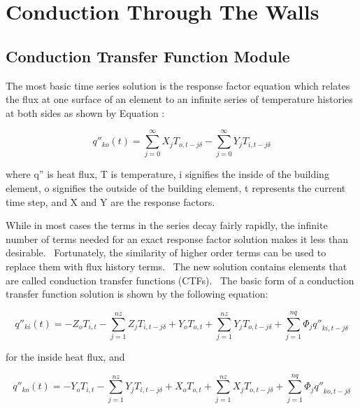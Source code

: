 \section{Conduction Through The Walls}\label{conduction-through-the-walls}

\subsection{Conduction Transfer Function Module}\label{conduction-transfer-function-module}

The most basic time series solution is the response factor equation which relates the flux at one surface of an element to an infinite series of temperature histories at both sides as shown by Equation :

\begin{equation}
{q''_{ko}}(t) = \sum\limits_{j = 0}^\infty  {{X_j}} {T_{o,t - j\delta }} - \sum\limits_{j = 0}^\infty  {{Y_j}} {T_{i,t - j\delta }}
\end{equation}

where q'' is heat flux, T is temperature, i signifies the inside of the building element, o signifies the outside of the building element, t represents the current time step, and X and Y are the response factors.

While in most cases the terms in the series decay fairly rapidly, the infinite number of terms needed for an exact response factor solution makes it less than desirable.~ Fortunately, the similarity of higher order terms can be used to replace them with flux history terms.~ The new solution contains elements that are called conduction transfer functions (CTFs).~ The basic form of a conduction transfer function solution is shown by the following equation:

\begin{equation}
{q''_{ki}}(t) =  - {Z_o}{T_{i,t}} - \sum\limits_{j = 1}^{nz} {{Z_j}} {T_{i,t - j\delta }} + {Y_o}{T_{o,t}} + \sum\limits_{j = 1}^{nz} {{Y_j}} {T_{o,t - j\delta }} + \sum\limits_{j = 1}^{nq} {{\Phi_j}{{q''}_{ki,t - j\delta }}}
\end{equation}

for the inside heat flux, and

\begin{equation}
{q''_{ko}}(t) =  - {Y_o}{T_{i,t}} - \sum\limits_{j = 1}^{nz} {{Y_j}} {T_{i,t - j\delta }} + {X_o}{T_{o,t}} + \sum\limits_{j = 1}^{nz} {{X_j}} {T_{o,t - j\delta }} + \sum\limits_{j = 1}^{nq} {{\Phi_j}{{q''}_{ko,t - j\delta }}}
\end{equation}

